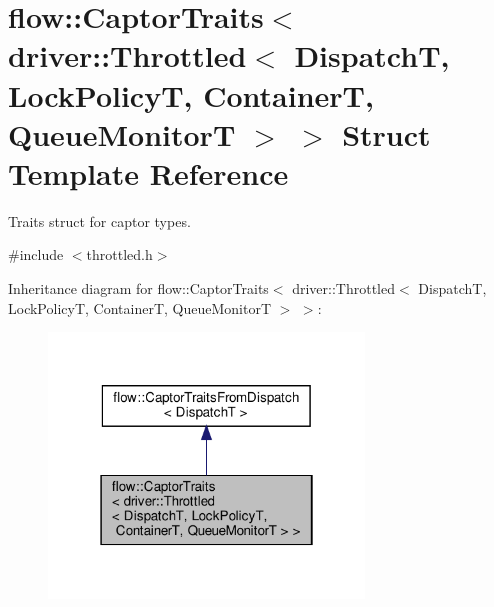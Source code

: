 \hypertarget{structflow_1_1_captor_traits_3_01driver_1_1_throttled_3_01_dispatch_t_00_01_lock_policy_t_00_01_a55b272e8914e815b1e61540d6e370f1}{}\section{flow\+:\+:Captor\+Traits$<$ driver\+:\+:Throttled$<$ DispatchT, Lock\+PolicyT, ContainerT, Queue\+MonitorT $>$ $>$ Struct Template Reference}
\label{structflow_1_1_captor_traits_3_01driver_1_1_throttled_3_01_dispatch_t_00_01_lock_policy_t_00_01_a55b272e8914e815b1e61540d6e370f1}


Traits struct for captor types.  




{\ttfamily \#include $<$throttled.\+h$>$}



Inheritance diagram for flow\+:\+:Captor\+Traits$<$ driver\+:\+:Throttled$<$ DispatchT, Lock\+PolicyT, ContainerT, Queue\+MonitorT $>$ $>$\+:
\nopagebreak
\begin{figure}[H]
\begin{center}
\leavevmode
\includegraphics[width=238pt]{structflow_1_1_captor_traits_3_01driver_1_1_throttled_3_01_dispatch_t_00_01_lock_policy_t_00_01_14c144804262ca375e62b50400bd9ca4}
\end{center}
\end{figure}


